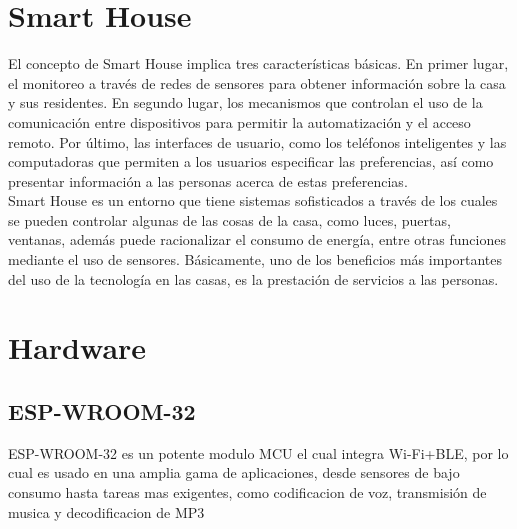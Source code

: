 \section{Smart House}

El concepto de Smart House implica tres características básicas. En primer lugar, el monitoreo a través de redes de sensores para obtener información sobre la casa y sus residentes. En segundo lugar, los mecanismos que controlan el uso de la comunicación entre dispositivos para permitir la automatización y el acceso remoto. Por último, las interfaces de usuario, como los teléfonos inteligentes y las computadoras que permiten a los usuarios especificar las preferencias, así como presentar información a las personas acerca de estas preferencias. \\

Smart House es un entorno que tiene sistemas sofisticados a través de los cuales se pueden controlar algunas de las cosas de la casa, como luces, puertas, ventanas, además  puede racionalizar el consumo de energía, entre otras funciones mediante el uso de sensores. Básicamente, uno de los beneficios más importantes del uso de la tecnología en las casas, es la prestación de servicios a las personas.\cite{Howedi2016} \\

\section{Hardware}

\subsection{ESP-WROOM-32}

\cite{EW32} ESP-WROOM-32 es un potente modulo MCU el cual integra Wi-Fi+BLE, por lo cual es usado en una amplia gama de aplicaciones, desde sensores de bajo consumo hasta tareas mas exigentes, como codificacion de voz, transmisión de musica y decodificacion de MP3

